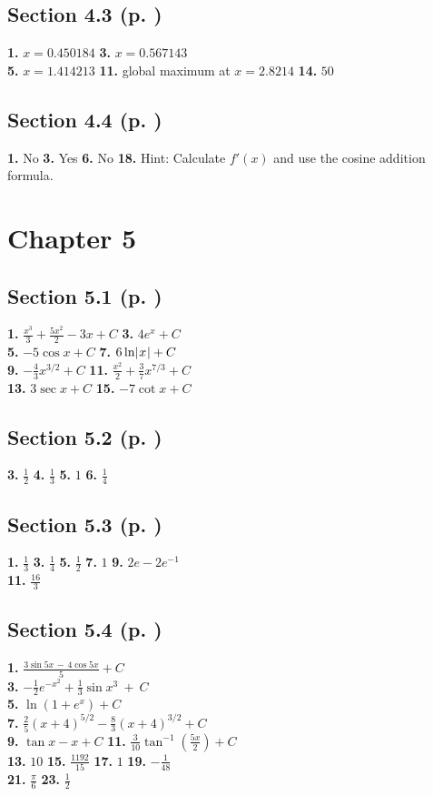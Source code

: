 \begin{multicols*}{2}
\subsection*{Section 4.3 (p. \pageref{sec4dot3})}
\textbf{1.} $x=0.450184$ \quad
\textbf{3.} $x=0.567143$\\
\textbf{5.} $x=1.414213$ \quad
\textbf{11.} global maximum at $x=2.8214$ \quad
\textbf{14.} $50$
\subsection*{Section 4.4 (p. \pageref{sec4dot4})}
\textbf{1.} No \quad
\textbf{3.} Yes \quad
\textbf{6.} No \quad
\textbf{18.} Hint: Calculate $f'(x)$ and use the cosine addition formula.
\section*{Chapter 5}
\subsection*{Section 5.1 (p. \pageref{sec5dot1})}
\textbf{1.} $\frac{x^3}{3} + \frac{5x^2}{2} - 3x + C$ \quad
\textbf{3.} $4e^x + C$\\
\textbf{5.} $-5 \cos x + C$ \quad
\textbf{7.} $6 \ln \lvert\mspace{1mu}x\mspace{1mu}\rvert + C$\\
\textbf{9.} $-\frac{4}{3}x^{3/2} + C$ \quad
\textbf{11.} $\frac{x^2}{2} + \frac{3}{7}x^{7/3} + C$\\
\textbf{13.} $3 \sec x + C$ \quad
\textbf{15.} $-7 \cot x + C$
\subsection*{Section 5.2 (p. \pageref{sec5dot2})}
\textbf{3.} $\frac{1}{2}$ \quad
\textbf{4.} $\frac{1}{3}$ \quad
\textbf{5.} $1$ \quad
\textbf{6.} $\frac{1}{4}$
\subsection*{Section 5.3 (p. \pageref{sec5dot3})}
\textbf{1.} $\frac{1}{3}$ \quad
\textbf{3.} $\frac{1}{4}$ \quad
\textbf{5.} $\frac{1}{2}$ \quad
\textbf{7.} $1$ \quad
\textbf{9.} $2e - 2e^{-1}$\\
\textbf{11.} $\frac{16}{3}$
\subsection*{Section 5.4 (p. \pageref{sec5dot4})}
\textbf{1.} $\frac{3 \sin 5x \,-\, 4 \cos 5x}{5} + C$\\
\textbf{3.} $-\frac{1}{2} e^{-x^2} + \frac{1}{3} \sin x^3 ~+~ C$\\
\textbf{5.} $\ln (1 + e^x) + C$\\
\textbf{7.} $\frac{2}{5} (x+4)^{5/2} - \frac{8}{3} (x+4)^{3/2} + C$\\
\textbf{9.} $\tan x - x + C$ \quad
\textbf{11.} $\frac{3}{10} \tan^{-1} \left(\frac{5x}{2}\right) + C$\\
\textbf{13.} $10$ \quad
\textbf{15.} $\frac{1192}{15}$ \quad
\textbf{17.} $1$ \quad
\textbf{19.} $-\frac{1}{48}$\\
\textbf{21.} $\frac{\pi}{6}$ \quad
\textbf{23.} $\frac{1}{2}$

\end{multicols*}
